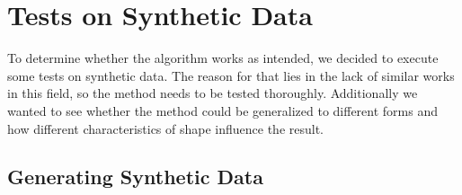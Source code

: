 \documentclass[pdftex,12pt,a4paper]{report}
\begin{document}
\section{Tests on Synthetic Data}

To determine whether the algorithm works as intended, we decided to execute some tests on synthetic data. The reason for that lies in the lack of similar works in this field, so the method needs to be tested thoroughly. Additionally we wanted to see whether the method could be generalized to different forms and how different characteristics of shape influence the result. 

\subsection{Generating Synthetic Data}
\label{sub:generating-synthetic-data}
\end{document}
